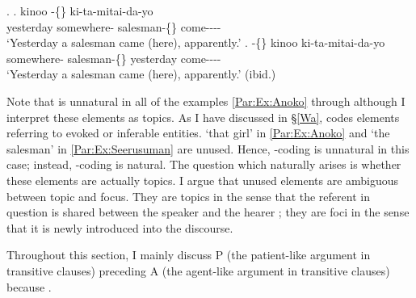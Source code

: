 \ex.
 \ag. kinoo  -\{\} ki-ta-mitai-da-yo \\
      yesterday somewhere- salesman-\{\} come---- \\
      `Yesterday a salesman came (here), apparently.'
 \bg.  -\{\} kinoo ki-ta-mitai-da-yo \\
      somewhere- salesman-\{\} yesterday come---- \\
      `Yesterday a salesman came (here), apparently.'
      \hfill{(ibid.)}

Note that  is unnatural in all of the examples \ref{Par:Ex:Anoko} through \Last
although I interpret these elements as topics.
As I have discussed in \S \ref{Wa},
 codes elements referring to evoked or inferable entities.
 `that girl' in \ref{Par:Ex:Anoko} and  `the salesman' in \ref{Par:Ex:Seerusuman} are unused.
Hence, -coding is unnatural in this case;
instead, -coding is natural.
The question which naturally arises is whether these elements are actually topics.
I argue that unused elements are ambiguous between topic and focus.
They are topics in the sense that the referent in question is shared between the speaker and the hearer ;
they are foci in the sense that it is newly introduced into the discourse.

Throughout this section,
I mainly discuss P (the patient-like argument in transitive clauses) preceding A (the agent-like argument in transitive clauses)
because .

